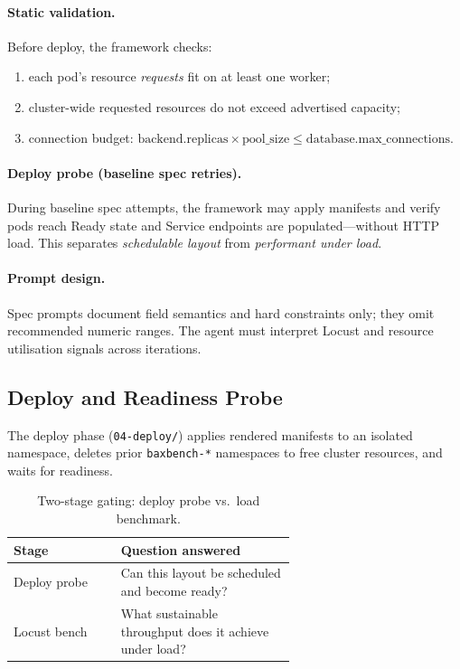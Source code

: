\paragraph{Static validation.}
Before deploy, the framework checks:
\begin{enumerate}
  \item each pod's resource \emph{requests} fit on at least one worker;
  \item cluster-wide requested resources do not exceed advertised capacity;
  \item connection budget:
        $\text{backend.replicas} \times \text{pool\_size} \leq
         \text{database.max\_connections}$.
\end{enumerate}

\paragraph{Deploy probe (baseline spec retries).}
During baseline spec attempts, the framework may apply manifests and verify pods
reach Ready state and Service endpoints are populated---without HTTP load.
This separates \emph{schedulable layout} from \emph{performant under load}.

\paragraph{Prompt design.}
Spec prompts document field semantics and hard constraints only; they omit
recommended numeric ranges.  The agent must interpret Locust and resource
utilisation signals across iterations.


\subsection{Deploy and Readiness Probe}
\label{sec:methods-deploy}

The deploy phase (\texttt{04-deploy/}) applies rendered manifests to an
isolated namespace, deletes prior \texttt{baxbench-*} namespaces to free
cluster resources, and waits for readiness.

\begin{table}[t]
  \centering
  \caption{Two-stage gating: deploy probe vs.\ load benchmark.}
  \label{tab:deploy-vs-bench}
  \small
  \begin{tabular}{@{}lp{0.62\linewidth}@{}}
    \toprule
    \textbf{Stage} & \textbf{Question answered} \\
    \midrule
    Deploy probe & Can this layout be scheduled and become ready? \\
    Locust bench & What sustainable throughput does it achieve under load? \\
    \bottomrule
  \end{tabular}
\end{table}

